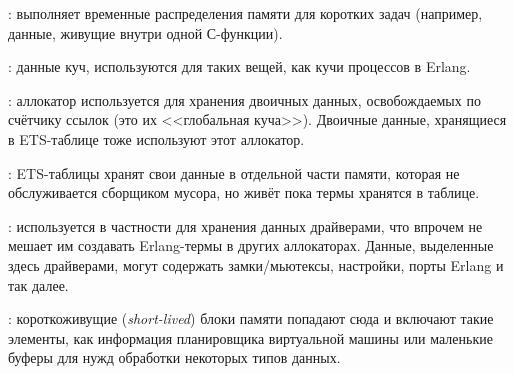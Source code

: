 \begin{enumerate*}
	\item {}: выполняет временные распределения памяти для коротких задач (например, данные, живущие внутри одной С-функции).
	\item {}: данные куч, используются для таких вещей, как кучи процессов в Erlang.
	\item {}: аллокатор используется для хранения двоичных данных, освобождаемых по счётчику ссылок (это их <<глобальная куча>>). Двоичные данные, хранящиеся в ETS-таблице тоже используют этот аллокатор.
	\item {}: ETS-таблицы хранят свои данные в отдельной части памяти, которая не обслуживается сборщиком мусора, но живёт пока термы хранятся в таблице.
	\item {}: используется в частности для хранения данных драйверами, что впрочем не мешает им создавать Erlang-термы в других аллокаторах. Данные, выделенные здесь драйверами, могут содержать замки/мьютексы, настройки, порты Erlang и так далее.
	\item {}: короткоживущие (\emph{short-lived}) блоки памяти попадают сюда и включают такие элементы, как информация планировщика виртуальной машины или маленькие буферы для нужд обработки некоторых типов данных.

\end{enumerate*}
